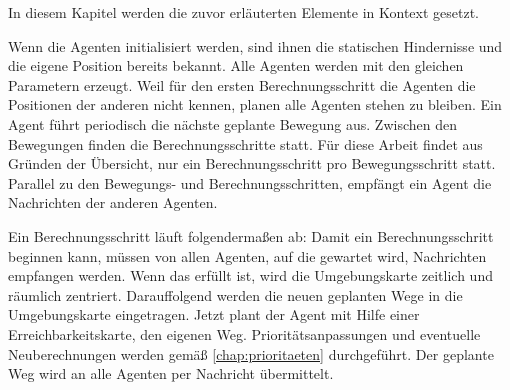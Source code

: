 In diesem Kapitel werden die zuvor erläuterten Elemente in Kontext gesetzt. 

Wenn die Agenten initialisiert werden, sind ihnen die statischen Hindernisse und die eigene Position bereits bekannt. Alle Agenten werden mit den gleichen Parametern erzeugt. Weil für den ersten Berechnungsschritt die Agenten die Positionen der anderen nicht kennen, planen alle Agenten stehen zu bleiben. Ein Agent führt periodisch die nächste geplante Bewegung aus. Zwischen den Bewegungen finden die Berechnungsschritte statt. Für diese Arbeit findet aus Gründen der Übersicht, nur ein Berechnungsschritt pro Bewegungsschritt statt. Parallel zu den Bewegungs- und Berechnungsschritten, empfängt ein Agent die Nachrichten der anderen Agenten. \cite{book:regele}

Ein Berechnungsschritt läuft folgendermaßen ab:\newline
Damit ein Berechnungsschritt beginnen kann, müssen von allen Agenten, auf die gewartet wird, Nachrichten empfangen werden. Wenn das erfüllt ist, wird die Umgebungskarte zeitlich und räumlich zentriert. Darauffolgend werden die neuen geplanten Wege in die Umgebungskarte eingetragen. Jetzt plant der Agent mit Hilfe einer Erreichbarkeitskarte, den eigenen Weg. Prioritätsanpassungen und eventuelle Neuberechnungen werden gemäß \ref{chap:prioritaeten} durchgeführt. Der geplante Weg wird an alle Agenten per Nachricht übermittelt. \cite{book:regele}